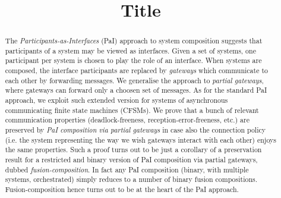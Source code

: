 \documentclass[copyright,creativecommons]{eptcs}
\author{
}
\begin{document}

\title{Title%
}

\def\titlerunning{Partial Fusion}
\def\authorrunning{
}

\maketitle

\begin{abstract}
The {\em Participants-as-Interfaces\/} (PaI) approach to system composition 
suggests that participants of a system may be viewed as interfaces.
Given a set of systems,
one participant per system is chosen to play the role of an interface. When systems are composed, the %
interface participants are replaced by  \emph{gateways} which communicate to each other
by forwarding messages.
We generalise the approach to 
\emph{partial gateways}, where 
gateways can forward only a choosen
set of messages. 
As for the standard PaI approach, we exploit such extended version for
systems of asynchronous  communicating finite state machines (CFSMs).
We prove that a bunch of relevant 
communication properties (deadlock-freeness, reception-error-freeness, etc.) are preserved by {\em PaI composition via partial gateways\/} in case also the
connection policy (i.e. the system representing the way we wish gateways interact with each other) enjoys the same properties.
Such a proof turns out to be just a corollary of a preservation result for a restricted
and binary version of PaI composition
via partial gateways, dubbed \emph{fusion-composition}.
In fact any 
PaI composition (binary, with multiple systems, orchestrated) simply reduces
to a number of binary fusion compositions.
Fusion-composition hence turns out to be at the heart of the PaI approach.
\end{abstract}








%
%
\setlength{\abovedisplayskip}{6pt}
\setlength{\belowdisplayskip}{\abovedisplayskip}
\end{document}
